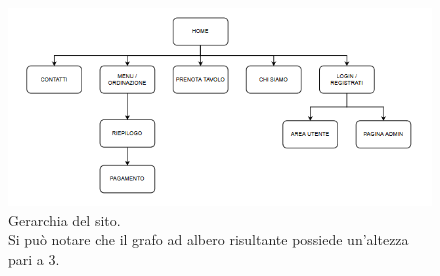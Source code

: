 \begin{figure}[H]
	\centering
	\includegraphics[scale=0.85]{resources/hierarchy.png}
	\caption{Gerarchia del sito.\\Si può notare che il grafo ad albero risultante
	possiede un'altezza pari a 3.}
\end{figure}